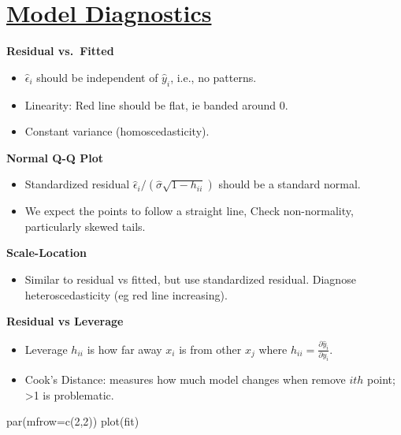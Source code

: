 \documentclass[
  letterpaper,
  DIV=11,
  numbers=noendperiod]{scrreprt}
\newenvironment{Shaded}{\begin{snugshade}}{\end{snugshade}}
\newcommand{\AttributeTok}[1]{\textcolor[rgb]{0.40,0.45,0.13}{#1}}
\newcommand{\DecValTok}[1]{\textcolor[rgb]{0.68,0.00,0.00}{#1}}
\newcommand{\FunctionTok}[1]{\textcolor[rgb]{0.28,0.35,0.67}{#1}}
\newcommand{\NormalTok}[1]{\textcolor[rgb]{0.00,0.23,0.31}{#1}}
\providecommand{\tightlist}{%
  \setlength{\itemsep}{0pt}\setlength{\parskip}{0pt}}\usepackage{longtable,booktabs,array}
\begin{document}
\hypertarget{model-diagnostics}{%
\section*{\texorpdfstring{\ul{Model
Diagnostics}}{Model Diagnostics}}\label{model-diagnostics}}


\textbf{Residual vs.~Fitted}

\begin{itemize}
\item
  \(\hat{\epsilon}_i\) should be independent of \(\hat{y}_i\), i.e., no
  patterns.
\item
  Linearity: Red line should be flat, ie banded around 0.
\item
  Constant variance (homoscedasticity).
\end{itemize}

\textbf{Normal Q-Q Plot}

\begin{itemize}
\item
  Standardized residual
  \(\hat{\epsilon}_i/ (\hat{ \sigma} \sqrt{1-h_{ii}})\) should be a
  standard normal.
\item
  We expect the points to follow a straight line, Check non-normality,
  particularly skewed tails.
\end{itemize}

\textbf{Scale-Location}

\begin{itemize}
\tightlist
\item
  Similar to residual vs fitted, but use standardized residual. Diagnose
  heteroscedasticity (eg red line increasing).
\end{itemize}

\textbf{Residual vs Leverage}

\begin{itemize}
\tightlist
\item
  Leverage \(h_{ii}\) is how far away \(x_i\) is from other \(x_j\)
  where \(h_{ii} = \frac{\partial \hat{y}_i}{\partial y_i}\).
\item
  Cook's Distance: measures how much model changes when remove \(ith\)
  point; \textgreater1 is problematic.
\end{itemize}

\begin{Shaded}
\begin{Highlighting}[]
\FunctionTok{par}\NormalTok{(}\AttributeTok{mfrow=}\FunctionTok{c}\NormalTok{(}\DecValTok{2}\NormalTok{,}\DecValTok{2}\NormalTok{))}
\FunctionTok{plot}\NormalTok{(fit)}
\end{Highlighting}
\end{Shaded}
\end{document}
